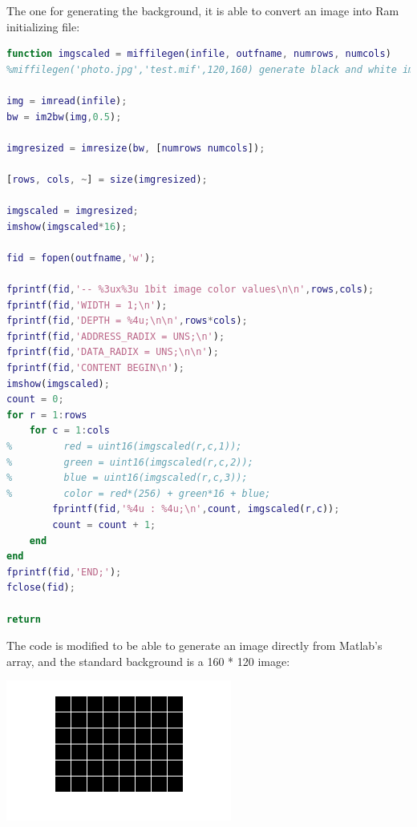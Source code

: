 \documentclass[11pt]{scrartcl}
\begin{document}
The one for generating the background, it is able to convert an image into Ram initializing file:
\begin{lstlisting}[language=Matlab]
function imgscaled = miffilegen(infile, outfname, numrows, numcols)
%miffilegen('photo.jpg','test.mif',120,160) generate black and white image.

img = imread(infile);
bw = im2bw(img,0.5);

imgresized = imresize(bw, [numrows numcols]);

[rows, cols, ~] = size(imgresized);

imgscaled = imgresized;
imshow(imgscaled*16);

fid = fopen(outfname,'w');

fprintf(fid,'-- %3ux%3u 1bit image color values\n\n',rows,cols);
fprintf(fid,'WIDTH = 1;\n');
fprintf(fid,'DEPTH = %4u;\n\n',rows*cols);
fprintf(fid,'ADDRESS_RADIX = UNS;\n');
fprintf(fid,'DATA_RADIX = UNS;\n\n');
fprintf(fid,'CONTENT BEGIN\n');
imshow(imgscaled);
count = 0;
for r = 1:rows
    for c = 1:cols
%         red = uint16(imgscaled(r,c,1));
%         green = uint16(imgscaled(r,c,2));
%         blue = uint16(imgscaled(r,c,3));
%         color = red*(256) + green*16 + blue;
        fprintf(fid,'%4u : %4u;\n',count, imgscaled(r,c));
        count = count + 1;
    end
end
fprintf(fid,'END;');
fclose(fid);

return
\end{lstlisting}

The code is modified to be able to generate an image directly from Matlab's array, and the standard background is a 160 * 120 image:
\begin{center}
\begin{minipage}[t]{\linewidth}

{
\includegraphics[scale = 1]{temp.png}
}
\end{minipage}
\medskip
\end{center}
\end{document}
